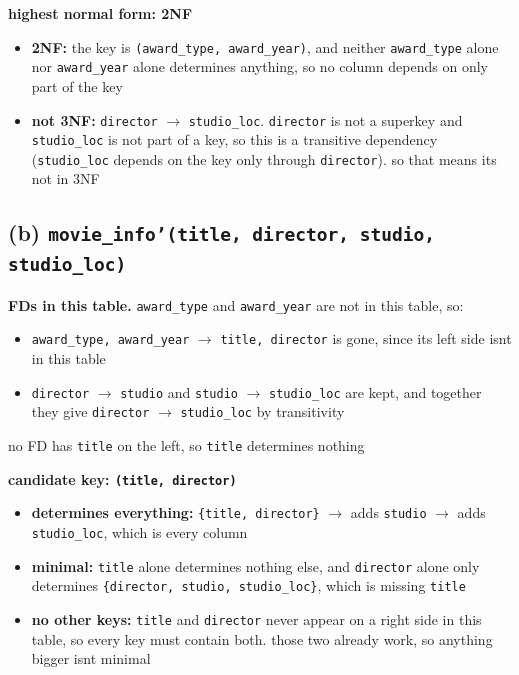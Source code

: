 \documentclass[11pt]{article}
\newcommand{\at}[1]{\texttt{#1}}
\begin{document}
\noindent\textbf{highest normal form: 2NF}
\begin{itemize}
  \item \textbf{2NF:} the key is \at{(award\_type, award\_year)}, and neither
    \at{award\_type} alone nor \at{award\_year} alone determines anything, so
    no column depends on only part of the key
  \item \textbf{not 3NF:} \at{director} $\to$ \at{studio\_loc}. \at{director}
    is not a superkey and \at{studio\_loc} is not part of a key, so this is a
    transitive dependency (\at{studio\_loc} depends on the key only through
    \at{director}). so that means its not in 3NF
\end{itemize}

\subsection*{(b) \at{movie\_info'(title, director, studio, studio\_loc)}}

\noindent\textbf{FDs in this table.} \at{award\_type} and \at{award\_year}
are not in this table, so:
\begin{itemize}
  \item \at{award\_type, award\_year} $\to$ \at{title, director} is gone,
    since its left side isnt in this table
  \item \at{director} $\to$ \at{studio} and \at{studio} $\to$
    \at{studio\_loc} are kept, and together they give \at{director} $\to$
    \at{studio\_loc} by transitivity
\end{itemize}
no FD has \at{title} on the left, so \at{title} determines nothing

\medskip
\noindent\textbf{candidate key: \at{(title, director)}}
\begin{itemize}
  \item \textbf{determines everything:} \at{\{title, director\}} $\to$ adds
    \at{studio} $\to$ adds \at{studio\_loc}, which is every column
  \item \textbf{minimal:} \at{title} alone determines nothing else, and
    \at{director} alone only determines \at{\{director, studio,
    studio\_loc\}}, which is missing \at{title}
  \item \textbf{no other keys:} \at{title} and \at{director} never appear on
    a right side in this table, so every key must contain both. those two
    already work, so anything bigger isnt minimal
\end{itemize}
\end{document}
